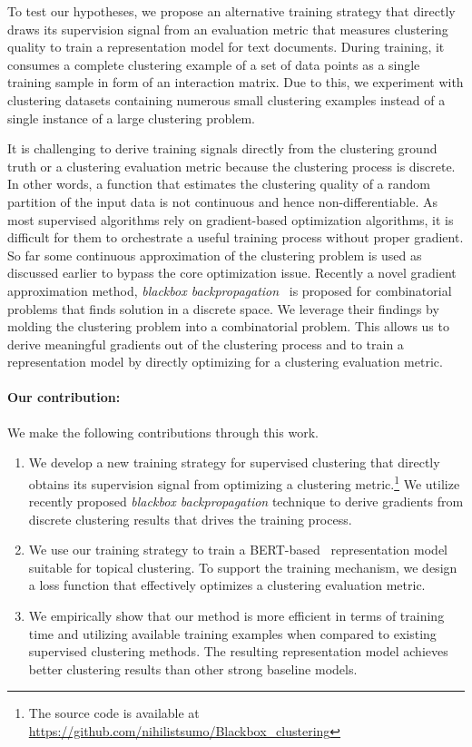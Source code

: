 \documentclass[11pt,a4paper]{article}
\begin{document}
To test our hypotheses, we propose an alternative training strategy that directly draws its supervision signal from an evaluation metric that measures clustering quality to train a representation model for text documents. During training, it consumes a complete clustering example of a set of data points as a single training sample in form of an interaction matrix. Due to this, we experiment with clustering datasets containing numerous small clustering examples instead of a single instance of a large clustering problem. 

It is challenging to derive training signals directly from the clustering ground truth or a clustering evaluation metric because the clustering process is discrete. In other words, a function that estimates the clustering quality of a random partition of the input data is not continuous and hence non-differentiable. As most supervised algorithms rely on gradient-based optimization algorithms, it is difficult for them to orchestrate a useful training process without proper gradient. So far some continuous approximation of the clustering problem is used as discussed earlier to bypass the core optimization issue. Recently a novel gradient approximation method, \textit{blackbox backpropagation}~\citep{vlastelica2019differentiation} is proposed for combinatorial problems that finds solution in a discrete space. We leverage their findings by molding the clustering problem into a combinatorial problem. This allows us to derive meaningful gradients out of the clustering process and to train a representation model by directly optimizing for a clustering evaluation metric.

\paragraph{Our contribution:} We make the following contributions through this work.
\begin{enumerate}
    \item We develop a new training strategy for supervised clustering that directly obtains its supervision signal from optimizing a clustering metric.\footnote{The source code is available at \url{https://github.com/nihilistsumo/Blackbox\_clustering}} We utilize recently proposed \textit{blackbox backpropagation} technique to derive gradients from discrete clustering results that drives the training process.
    \item We use our training strategy to train a BERT-based~\citep{devlin2018bert} representation model suitable for topical clustering. To support the training mechanism, we design a loss function that effectively optimizes a clustering evaluation metric.
    \item We empirically show that our method is more efficient in terms of training time and utilizing available training examples when compared to existing supervised clustering methods. The resulting representation model achieves better clustering results than other strong baseline models.
\end{enumerate}
\end{document}
